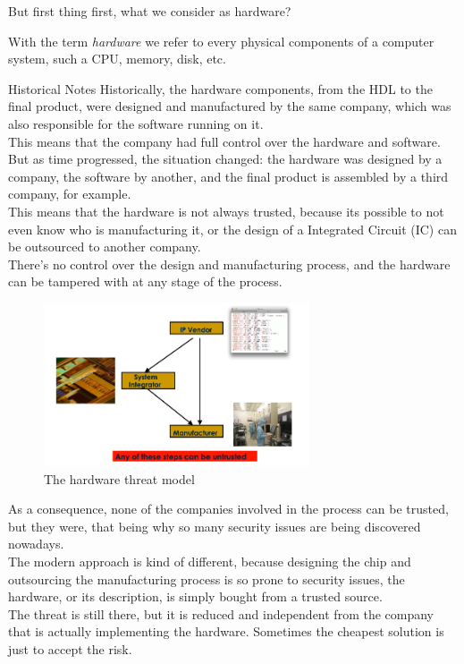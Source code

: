 But first thing first, what we consider as hardware?\\
\begin{boxH}
  With the term \textit{hardware} we refer to every physical components of a computer system, such a
  CPU, memory, disk, etc.
\end{boxH}
\begin{section}{Historical Notes}
  Historically, the hardware components, from the HDL to the final product, were designed and 
  manufactured by the same company, which was also responsible for the software running on it.\\
  This means that the company had full control over the hardware and software.\\
  But as time progressed, the situation changed: the hardware was designed by a company, the software by
  another, and the final product is assembled by a third company, for example.\\
  This means that the hardware is not always trusted, because its possible to not even know who
  is manufacturing it, or the design of a Integrated Circuit (IC) can be outsourced to another company.\\
  There's no control over the design and manufacturing process, and the hardware can be tampered with
  at any stage of the process.\\
  \begin{figure}[H]
    \centering
    \includegraphics[width=0.7\textwidth]{img/hardware/supply chain.png}
    \caption{The hardware threat model}
  \end{figure}
  As a consequence, none of the companies involved in the process can be trusted, but they were,
  that being why so many security issues are being discovered nowadays.\\
  The modern approach is kind of different, because designing the chip and outsourcing the manufacturing process is 
  so prone to security issues, the hardware, or its description, is simply bought from a trusted 
  source.\\
  The threat is still there, but it is reduced and independent from the company that is actually
  implementing the hardware. Sometimes the cheapest solution is just to accept the risk.\\


\end{section}
